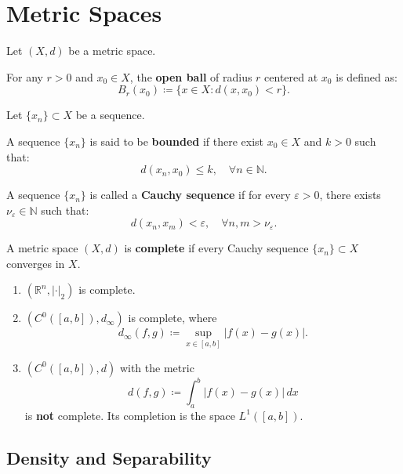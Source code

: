 \section{Metric Spaces}

Let \((X, d)\) be a metric space.

\begin{definition}
For any \(r > 0\) and \(x_0 \in X\), the \textbf{open ball} of radius \(r\) centered at \(x_0\) is defined as:
\[
B_r(x_0) \coloneqq \{ x \in X : d(x, x_0) < r \}.
\]
\end{definition}

Let \(\{x_n\} \subset X\) be a sequence.

\begin{definition}
A sequence \(\{x_n\}\) is said to be \textbf{bounded} if there exist \(x_0 \in X\) and \(k > 0\) such that:
\[
d(x_n, x_0) \leq k, \quad \forall n \in \mathbb{N}.
\]
\end{definition}

\begin{definition}
A sequence \(\{x_n\}\) is called a \textbf{Cauchy sequence} if for every \(\varepsilon > 0\), there exists \(\nu_\varepsilon \in \mathbb{N}\) such that:
\[
d(x_n, x_m) < \varepsilon, \quad \forall n, m > \nu_\varepsilon.
\]
\end{definition}

\begin{definition}
A metric space \((X, d)\) is \textbf{complete} if every Cauchy sequence \(\{x_n\} \subset X\) converges in \(X\).
\end{definition}

\begin{example} 
\begin{enumerate}
    \item \((\mathbb{R}^n, |\cdot|_2)\) is complete.
    \item \((C^0([a,b]), d_\infty)\) is complete, where
    \[
    d_\infty(f, g) \coloneqq \sup_{x \in [a,b]} |f(x) - g(x)|.
    \]
    \item \((C^0([a,b]), d)\) with the metric
    \[
    d(f, g) \coloneqq \int_a^b |f(x) - g(x)| \, dx
    \]
    is \textbf{not} complete. Its completion is the space \(L^1([a,b])\).
\end{enumerate}
\end{example}

\subsection{Density and Separability}

